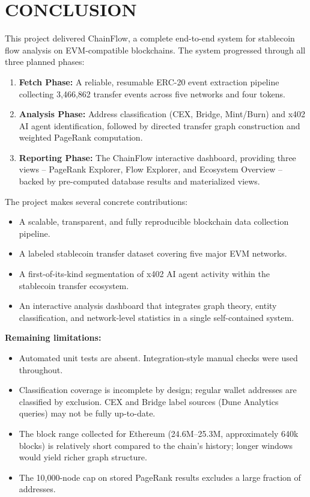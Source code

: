 \documentclass[a4paper,12pt]{report}
\begin{document}
\chapter{CONCLUSION}

This project delivered ChainFlow, a complete end-to-end system for stablecoin flow analysis on
EVM-compatible blockchains. The system progressed through all three planned phases:

\begin{enumerate}
\item \textbf{Fetch Phase:} A reliable, resumable ERC-20 event extraction pipeline collecting
3,466,862 transfer events across five networks and four tokens.
\item \textbf{Analysis Phase:} Address classification (CEX, Bridge, Mint/Burn) and x402 AI
agent identification, followed by directed transfer graph construction and weighted PageRank
computation.
\item \textbf{Reporting Phase:} The ChainFlow interactive dashboard, providing three views --
PageRank Explorer, Flow Explorer, and Ecosystem Overview -- backed by pre-computed database
results and materialized views.
\end{enumerate}

The project makes several concrete contributions:
\begin{itemize}
\item A scalable, transparent, and fully reproducible blockchain data collection pipeline.
\item A labeled stablecoin transfer dataset covering five major EVM networks.
\item A first-of-its-kind segmentation of x402 AI agent activity within the stablecoin
transfer ecosystem.
\item An interactive analysis dashboard that integrates graph theory, entity classification,
and network-level statistics in a single self-contained system.
\end{itemize}

\textbf{Remaining limitations:}
\begin{itemize}
\item Automated unit tests are absent. Integration-style manual checks were used throughout.
\item Classification coverage is incomplete by design; regular wallet addresses are classified
by exclusion. CEX and Bridge label sources (Dune Analytics queries) may not be fully up-to-date.
\item The block range collected for Ethereum (24.6M--25.3M, approximately 640k blocks) is
relatively short compared to the chain's history; longer windows would yield richer graph structure.
\item The 10,000-node cap on stored PageRank results excludes a large fraction of addresses.
\end{itemize}
\end{document}
